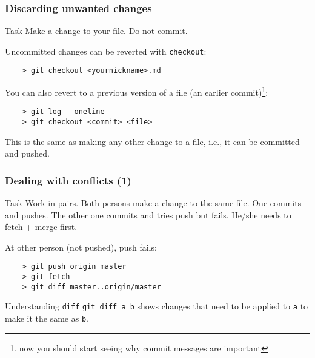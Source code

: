 \begin{frame}[fragile]
	\frametitle{Discarding unwanted changes}
	
	\begin{block}{Task}
	Make a change to your file. Do not commit.	
	\end{block}
	
	Uncommitted changes can be reverted with \texttt{checkout}:
	\begin{verbatim}
	> git checkout <yournickname>.md
	\end{verbatim}
	
	You can also revert to a previous version of a file (an earlier commit)\footnote{now you should start seeing why commit messages are important}:
	\begin{verbatim}
	> git log --oneline
	> git checkout <commit> <file>
	\end{verbatim}
	This is the same as making any other change to a file, i.e., it can be committed and pushed.
\end{frame}


\begin{frame}[fragile]
	\frametitle{Dealing with conflicts (1)}
	
	\begin{block}{Task}
	Work in pairs. Both persons make a change to the same file. One commits and pushes. The other one commits and tries push but fails. He/she needs to fetch + merge first.	
	\end{block}
	
	At other person (not pushed), push fails:
	\begin{verbatim}
	> git push origin master
	> git fetch
	> git diff master..origin/master
	\end{verbatim}
	
	\begin{block}{Understanding \texttt{diff}}
	\texttt{git diff a b} shows changes that need to be applied to \texttt{a} to make it the same as \texttt{b}.
	\end{block}
\end{frame}

